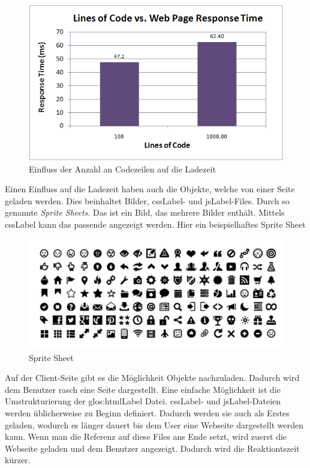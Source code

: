 \begin{figure}[H]
	\centering
	\includegraphics[width=.8\linewidth]{images/lines-of-code-response-time.png}
	\caption{Einfluss der Anzahl an Codezeilen auf die Ladezeit}
	\label{fig:requirementsengineerin:nichtfunktionale:geschwindigkeit:loc}
\end{figure}

Einen Einfluss auf die Ladezeit haben auch die Objekte, welche von einer Seite geladen werden. Dies beinhaltet Bilder, \gls{cssLabel}- und \gls{jsLabel}-Files. Durch so genannte \textit{Sprite Sheets}. Das ist ein Bild, das mehrere Bilder enthält. Mittels \gls{cssLabel} kann das passende angezeigt werden. Hier ein beispielhaftes Sprite Sheet

\begin{figure}[H]
	\centering
	\includegraphics[width=.6\linewidth]{images/sprite_sheet.png}
	\caption{Sprite Sheet}
	\label{fig:requirementsengineerin:nichtfunktionale:geschwindigkeit:spritesheet}
\end{figure}

Auf der Client-Seite gibt es die Möglichkeit Objekte nachzuladen. Dadurch wird dem Benutzer rasch eine Seite dargestellt. Eine einfache Möglichkeit ist die Umstrukturierung der \Gls{glos:htmlLabel} Datei. \gls{cssLabel}- und \gls{jsLabel}-Dateien werden üblicherweise zu Beginn definiert. Dadurch werden sie auch als Erstes geladen, wodurch es länger dauert bis dem User eine Webseite dargestellt werden kann. Wenn man die Referenz auf diese Files ans Ende setzt, wird zuerst die Webseite geladen und dem Benutzer angezeigt. Dadurch wird die Reaktiontszeit kürzer.

